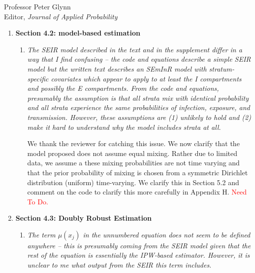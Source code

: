 \documentclass[11pt]{letter} %
\begin{document}
\begin{letter}{Professor
	Peter Glynn\\
	Editor, {\em Journal of Applied Probability}}
\begin{enumerate}
\begin{enumerate}
	Section 4.1.3 allows researchers to choose to go beyond simpler moving window averages (i.e., weekly averages).  The kernel function allows the user to choose weighted averages that may be more robust than the uniform kernel (which is equivalent to the moving averages).  This approach helps smooth the estimated propensity over time; moreover, the flexibility of the approach for government agencies who may observed random samples at different frequencies is of practical importance.
	\vspace{5mm}
\end{enumerate}
\item {\bf Section 4.2: model-based estimation}
\begin{enumerate}
	\item {\it The SEIR model described in the text and in the supplement differ in a way that I find confusing – the code and equations describe a simple SEIR model but the written text describes an SEmInR model with stratum-specific covariates which appear to apply to at least the I compartments and possibly the E compartments. From the code and equations, presumably the assumption is that all strata mix with identical probability and all strata experience the same probabilities of infection, exposure, and transmission. However, these assumptions are (1) unlikely to hold and (2) make it hard to understand why the model includes strata at all. }
	\vspace{5mm}

	We thank the reviewer for catching this issue.  We now clarify that the model proposed does not assume equal mixing.  Rather due to limited data, we assume a these mixing probabilities are not time varying and that the  prior probability of mixing is chosen from a symmetric Dirichlet distribution (uniform) time-varying.  We clarify this in Section 5.2 and comment on the code to clarify this more carefully in Appendix H.
	\textcolor{red}{Need To Do.}
	\vspace{5mm}
\end{enumerate}
\item {\bf Section 4.3: Doubly Robust Estimation}
\begin{enumerate}
	\item {\it The term $\mu(x_j)$ in the unnumbered equation does not seem to be defined anywhere – this is presumably coming from the SEIR model given that the rest of the equation is essentially the IPW-based estimator. However, it is unclear to me what output from the SEIR this term includes.}
	\vspace{5mm}


\end{enumerate}
\end{enumerate}
\end{letter}
\end{document}

